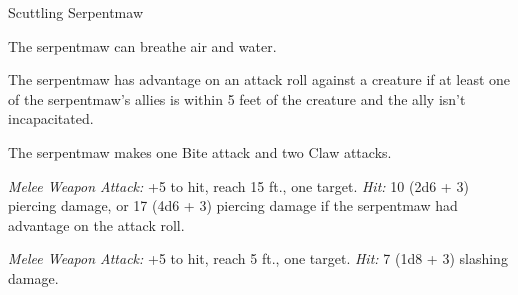 \documentclass[10pt,a4paper,twoside,bg=none,twocolumn,openany,nodeprecatedcode]{dndbook}
\begin{document}
\begin{DndMonster}[float=t]{Scuttling Serpentmaw}
\DndMonsterBasics[
armor-class = {17 (natural armor)},
hit-points = {\DndDice{10d6 + 30}},
speed = {30 ft.}
]
\DndMonsterAbilityScores[
 str = 16,
 dex = 14,
 con = 16,
 int = 3,
 wis = 11,
 cha = 3
]
\DndMonsterDetails[
skills = {Stealth +6},
senses = {blindsight 60 ft. (blind beyond this radius), passive perception 10},
challenge = 4,
]
The serpentmaw can breathe air and water.

The serpentmaw has advantage on an attack roll against a creature if at least one of the serpentmaw's allies is within 5 feet of the creature and the ally isn't incapacitated.

\par
{}
The serpentmaw makes one Bite attack and two Claw attacks.

\textsl{Melee Weapon Attack:} +5 to hit, reach 15 ft., one target. \textsl{Hit:} 10 (2d6 + 3) piercing damage, or 17 (4d6 + 3) piercing damage if the serpentmaw had advantage on the attack roll.

\textsl{Melee Weapon Attack:} +5 to hit, reach 5 ft., one target. \textsl{Hit:} 7 (1d8 + 3) slashing damage.

\end{DndMonster}
\end{document}
